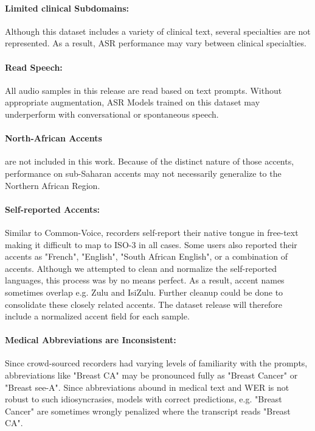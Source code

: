 \documentclass[11pt,a4paper]{article}
\begin{document}
\paragraph{Limited clinical Subdomains:} Although this dataset includes a variety of clinical text, several specialties are not represented. As a result, ASR performance may vary between clinical specialties.

\paragraph{Read Speech:} All audio samples in this release are read based on text prompts. Without appropriate augmentation, ASR Models trained on this dataset may underperform with conversational or spontaneous speech. %

\paragraph{North-African Accents} are not included in this work. Because of the distinct nature of those accents, performance on sub-Saharan accents may not necessarily generalize to the Northern African Region.

\paragraph{Self-reported Accents:} Similar to Common-Voice, recorders self-report their native tongue in free-text making it difficult to map to ISO-3 in all cases. Some users also reported their accents as "French", "English", "South African English", or a combination of accents. Although we attempted to clean and normalize the self-reported languages, this process was by no means perfect. As a result, accent names sometimes overlap e.g. Zulu and IsiZulu. Further cleanup could be done to consolidate these closely related accents. The dataset release will therefore include a normalized accent field for each sample. %


\paragraph{Medical Abbreviations are Inconsistent:} Since crowd-sourced recorders had varying levels of familiarity with the prompts, abbreviations like "Breast CA" may be pronounced fully as "Breast Cancer" or "Breast see-A". Since abbreviations abound in medical text and WER is not robust to such idiosyncrasies, models with correct predictions, e.g. "Breast Cancer" are sometimes wrongly penalized where the transcript reads "Breast CA".
\end{document}
